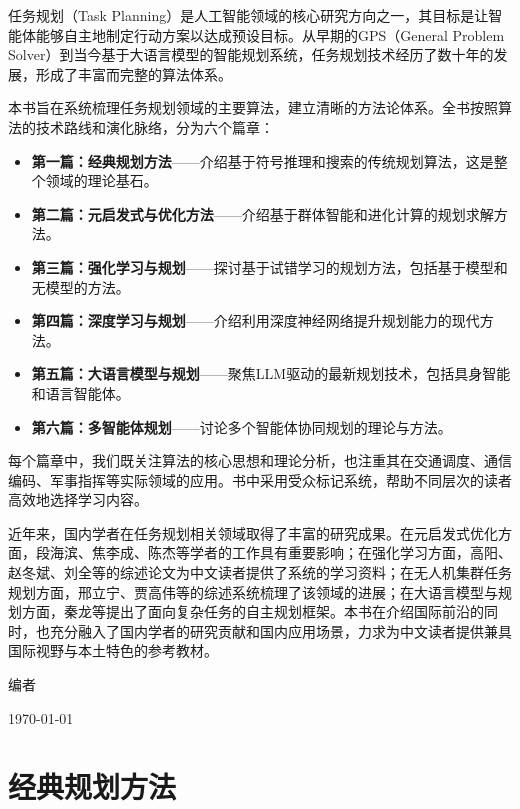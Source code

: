 \documentclass[a4paper,12pt,openany]{ctexbook}
\theoremstyle{definition}
\theoremstyle{plain}
\begin{document}
任务规划（Task Planning）是人工智能领域的核心研究方向之一，其目标是让智能体能够自主地制定行动方案以达成预设目标。从早期的GPS（General Problem Solver）到当今基于大语言模型的智能规划系统，任务规划技术经历了数十年的发展，形成了丰富而完整的算法体系。

本书旨在系统梳理任务规划领域的主要算法，建立清晰的方法论体系。全书按照算法的技术路线和演化脉络，分为六个篇章：

\begin{itemize}[leftmargin=2em]
  \item \textbf{第一篇：经典规划方法}——介绍基于符号推理和搜索的传统规划算法，这是整个领域的理论基石。
  \item \textbf{第二篇：元启发式与优化方法}——介绍基于群体智能和进化计算的规划求解方法。
  \item \textbf{第三篇：强化学习与规划}——探讨基于试错学习的规划方法，包括基于模型和无模型的方法。
  \item \textbf{第四篇：深度学习与规划}——介绍利用深度神经网络提升规划能力的现代方法。
  \item \textbf{第五篇：大语言模型与规划}——聚焦LLM驱动的最新规划技术，包括具身智能和语言智能体。
  \item \textbf{第六篇：多智能体规划}——讨论多个智能体协同规划的理论与方法。
\end{itemize}

每个篇章中，我们既关注算法的核心思想和理论分析，也注重其在交通调度、通信编码、军事指挥等实际领域的应用。书中采用受众标记系统，帮助不同层次的读者高效地选择学习内容。

近年来，国内学者在任务规划相关领域取得了丰富的研究成果。在元启发式优化方面，段海滨、焦李成、陈杰等学者的工作具有重要影响；在强化学习方面，高阳、赵冬斌、刘全等的综述论文为中文读者提供了系统的学习资料；在无人机集群任务规划方面，邢立宁、贾高伟等的综述系统梳理了该领域的进展；在大语言模型与规划方面，秦龙等提出了面向复杂任务的自主规划框架。本书在介绍国际前沿的同时，也充分融入了国内学者的研究贡献和国内应用场景，力求为中文读者提供兼具国际视野与本土特色的参考教材。

\vspace{2em}
\hfill 编者

\hfill \today

\part{经典规划方法}
\end{document}
